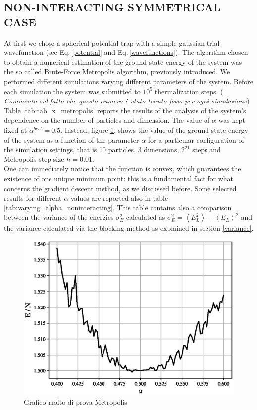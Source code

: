 \subsection{NON-INTERACTING SYMMETRICAL CASE}
At first we chose a spherical potential trap with a simple gaussian trial wavefunction (see Eq.\,\ref{potential} and Eq.\,\ref{wavefunctions}). The algorithm chosen to obtain a numerical estimation of the ground state energy of the system was the so called Brute-Force Metropolis algorithm, previously introduced. We performed different simulations varying different parameters of the system. Before each simulation the system was submitted to $10^5$ thermalization steps. ( \textit{Commento sul fatto che questo numero è stato tenuto fisso per ogni simulazione})
Table \ref{tab:tab_x_metropolis} reports the results of the analysis of the system's dependence on the number of particles and dimension. The value of $\alpha$ was kept fixed at $\alpha^{best} = 0.5$. Instead, figure \ref{fig:varying_alpha_noninteract_metropolis}, shows the value of the ground state energy of the system as a function of the parameter $\alpha$ for a particular configuration of the simulation settings, that is 10 particles, 3 dimensions, $2^{21}$ steps and Metropolis step-size $h = 0.01$. \\ One can immediately notice that the function is convex, which guarantees the existence of one unique minimum point: this is a fundamental fact for what concerns the gradient descent method, as we discussed before. Some selected results for different $\alpha$ values are reported also in table \ref{tab:varying_alpha_noninteracting}. This table contains also a comparison between the variance of the energies $\sigma^2_E$ calculated as $\sigma^2_E = \left\langle E_L^2 \right\rangle - \left\langle E_L \right\rangle^2$ and the variance calculated via the blocking method as explained in section \ref{variance}.
\begin{figure}[H]
    \centering
    \includegraphics[scale=0.5]{images/varying_alpha_noninteract.eps}
    \caption{Grafico molto di prova Metropolis}
    \label{fig:varying_alpha_noninteract_metropolis}
\end{figure}


